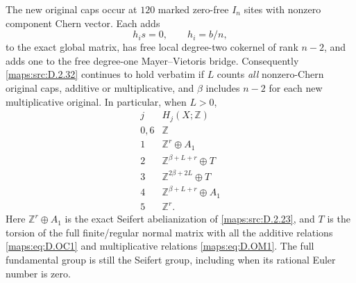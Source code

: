 \begin{theorem}
The new original caps occur at $120$ marked zero-free
$I_n$ sites with nonzero component Chern vector. Each adds
\[
 h_i s=0,\qquad h_i=b/n,                                   \tag{D.OM1}\label{maps:eq:D.OM1}
\]
to the exact global matrix, has free local degree-two
cokernel of rank $n-2$, and adds one to the free
degree-one Mayer--Vietoris bridge. Consequently \ref{maps:src:D.2.32}
continues to hold verbatim if $L$ counts \emph{all}
nonzero-Chern original caps, additive or multiplicative,
and $\beta$ includes $n-2$ for each new multiplicative
original. In particular, when $L>0$,
\[
\begin{array}{c|c}
j&H_j(X;\mathbb Z)\\\hline
0,6&\mathbb Z\\
1&\mathbb Z^r\oplus A_1\\
2&\mathbb Z^{\beta+L+r}\oplus T\\
3&\mathbb Z^{2\beta+2L}\oplus T\\
4&\mathbb Z^{\beta+L+r}\oplus A_1\\
5&\mathbb Z^r.
\end{array}                                                \tag{D.OM2}\label{maps:eq:D.OM2}
\]
Here $\mathbb Z^r\oplus A_1$ is the exact Seifert
abelianization of \ref{maps:src:D.2.23}, and $T$ is the torsion of the
full finite/regular normal matrix with all the additive
relations \eqref{maps:eq:D.OC1} and multiplicative relations \eqref{maps:eq:D.OM1}.
The full fundamental group is still the Seifert group,
including when its rational Euler number is zero.

\end{theorem}


